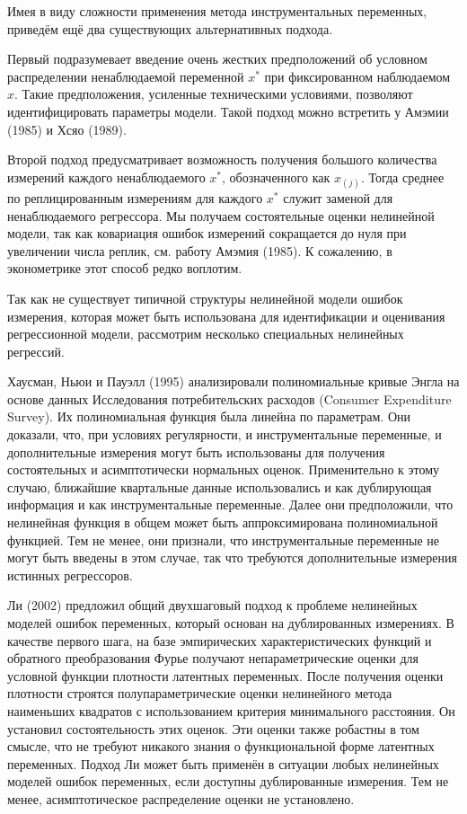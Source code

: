 Имея в виду сложности применения метода инструментальных переменных, приведём ещё два существующих альтернативных подхода.

Первый подразумевает введение очень жестких предположений об условном распределении ненаблюдаемой переменной $x^*$ при фиксированном наблюдаемом $x$. Такие предположения, усиленные техническими условиями, позволяют идентифицировать параметры модели. Такой подход можно встретить у Амэмии (1985) и Хсяо (1989).

Второй подход предусматривает возможность получения большого количества измерений каждого ненаблюдаемого $x^*$, обозначенного как $x_{(j)}$. Тогда среднее по реплицированным измерениям для каждого $x^*$ служит заменой для ненаблюдаемого регрессора. Мы получаем состоятельные оценки нелинейной модели, так как ковариация ошибок измерений сокращается до нуля при увеличении числа реплик, см. работу Амэмия (1985). К сожалению, в эконометрике этот способ редко воплотим.

Так как не существует типичной структуры нелинейной модели ошибок измерения, которая может быть использована для идентификации и оценивания регрессионной модели, рассмотрим несколько специальных нелинейных регрессий.

Хаусман, Ньюи и Пауэлл (1995) анализировали полиномиальные кривые Энгла на основе данных Исследования потребительских расходов (Consumer Expenditure Survey). Их полиномиальная функция была линейна по параметрам. Они доказали, что, при условиях регулярности, и инструментальные переменные, и дополнительные измерения могут быть использованы для получения состоятельных и асимптотически нормальных оценок. Применительно к этому случаю, ближайшие квартальные данные использовались и как дублирующая информация и как инструментальные переменные. Далее они предположили, что нелинейная функция в общем может быть аппроксимирована полиномиальной функцией. Тем не менее, они признали, что инструментальные переменные не могут быть введены в этом случае, так что требуются дополнительные измерения истинных регрессоров.

Ли (2002) предложил общий двухшаговый подход к проблеме нелинейных моделей ошибок переменных, который основан на дублированных измерениях. В качестве первого шага, на базе эмпирических характеристических функций и обратного преобразования Фурье получают непараметрические оценки для условной функции плотности латентных переменных. После получения оценки плотности строятся полупараметрические оценки нелинейного метода наименьших квадратов с использованием критерия минимального расстояния. Он установил состоятельность этих оценок. Эти оценки также робастны в том смысле, что не требуют никакого знания о функциональной форме латентных переменных. Подход Ли может быть применён в ситуации любых нелинейных моделей ошибок переменных, если доступны дублированные измерения. Тем не менее, асимптотическое распределение оценки не установлено.

